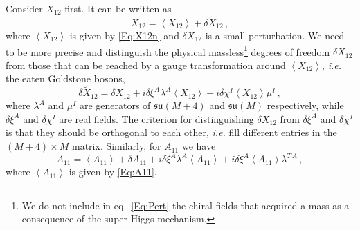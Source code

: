 \documentclass[a4paper,12pt]{article}
\begin{document}
{Consider $X_{12}$ first. It can be written as
\begin{equation}
X_{12} = \left< X_{12} \right> + \delta \tilde{X}_{12} \, , \label{Eq:Pert}
\end{equation}
where $\left< X_{12} \right>$ is given by \eqref{Eq:X12n} and $\delta \tilde{X}_{12}$ is a small perturbation. We need to be more precise and distinguish the physical massless\footnote{We do not include in eq.~\eqref{Eq:Pert} the chiral fields that acquired a mass as a consequence of the super-Higgs mechanism.} degrees of freedom $\delta X_{12}$ from those that can be reached by a gauge transformation around $\left< X_{12} \right>$, {\it i.e.} the eaten Goldstone bosons,
\begin{equation}
\delta\tilde{X} _{12} = \delta {X}_{12} + i \delta\xi^A \lambda^A \left<X_{12}\right> - i \delta\chi^I  \left<X_{12}\right> \mu^I \, ,
\end{equation}
where $\lambda^A$ and $\mu^I$ are generators of $\mathfrak{su}(M+4)$ and $\mathfrak{su}(M)$ respectively, while $\delta \xi^A$ and $\delta \chi^I$ are 
real fields. The criterion for distinguishing $\delta X_{12}$ from $\delta \xi^A$ and $\delta \chi^I$ is that they should be orthogonal to each other, {\it i.e.} fill different entries in the $(M+4)\times M$ matrix.  
Similarly, for $A_{11}$ we have
\begin{equation}
A_{11} = \left< A_{11}\right> + \delta {A}_{11}  + i \delta\xi^A \lambda^A \left<A_{11}\right> + i \delta\xi^A  \left<A_{11}\right> \lambda^{T\, A} \, ,
\end{equation}
where $\left<A_{11}\right>$ is given by \eqref{Eq:A11}. 

}
\end{document}
